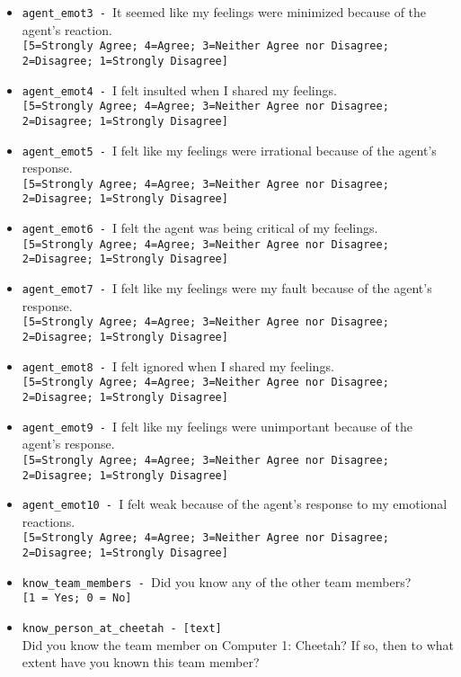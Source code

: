 \begin{description}
\begin{addmargin}[0em]{0em}
\begin{addmargin}[1em]{0em}
\begin{itemize}
            \item \verb|agent_emot3 - |It seemed like my feelings were minimized because of the agent's reaction.\\\verb|[5=Strongly Agree; 4=Agree; 3=Neither Agree nor Disagree; 2=Disagree; 1=Strongly Disagree]|
            \item \verb|agent_emot4 - |I felt insulted when I shared my feelings.\\\verb|[5=Strongly Agree; 4=Agree; 3=Neither Agree nor Disagree; 2=Disagree; 1=Strongly Disagree]|
            \item \verb|agent_emot5 - |I felt like my feelings were irrational because of the agent's response.\\\verb|[5=Strongly Agree; 4=Agree; 3=Neither Agree nor Disagree; 2=Disagree; 1=Strongly Disagree]|
            \item \verb|agent_emot6 - |I felt the agent was being critical of my feelings.\\\verb|[5=Strongly Agree; 4=Agree; 3=Neither Agree nor Disagree; 2=Disagree; 1=Strongly Disagree]|
            \item \verb|agent_emot7 - |I felt like my feelings were my fault because of the agent's response.\\\verb|[5=Strongly Agree; 4=Agree; 3=Neither Agree nor Disagree; 2=Disagree; 1=Strongly Disagree]|
            \item \verb|agent_emot8 - |I felt ignored when I shared my feelings.\\\verb|[5=Strongly Agree; 4=Agree; 3=Neither Agree nor Disagree; 2=Disagree; 1=Strongly Disagree]|
            \item \verb|agent_emot9 - |I felt like my feelings were unimportant because of the agent's response.\\\verb|[5=Strongly Agree; 4=Agree; 3=Neither Agree nor Disagree; 2=Disagree; 1=Strongly Disagree]|
            \item \verb|agent_emot10 - |I felt weak because of the agent's response to my emotional reactions.\\\verb|[5=Strongly Agree; 4=Agree; 3=Neither Agree nor Disagree; 2=Disagree; 1=Strongly Disagree]|
            \item \verb|know_team_members - |Did you know any of the other team members?\\\verb|[1 = Yes; 0 = No]|
            \item \verb|know_person_at_cheetah - [text]|\\Did you know the team member on Computer 1: Cheetah? If so, then to what extent have you known this team member?

\end{itemize}
\end{addmargin}
\end{addmargin}
\end{description}
